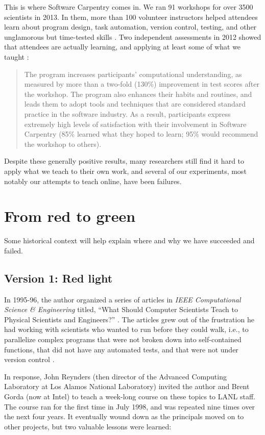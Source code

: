 \documentclass[10pt,a4paper,twocolumn]{article}
\begin{document}
This is where Software Carpentry comes in. We ran 91 workshops for
over 3500 scientists in 2013. In them, more than 100 volunteer
instructors helped attendees learn about program design, task
automation, version control, testing, and other unglamorous but
time-tested skills \cite{wilson2013}. Two independent assessments in
2012 showed that attendees are actually learning, and applying at least
some of what we taught \cite{aranda2012}:

\begin{quote}
The program increases participants' computational understanding, as
measured by more than a two-fold (130\%) improvement in test scores
after the workshop. The program also enhances their habits and routines,
and leads them to adopt tools and techniques that are considered
standard practice in the software industry. As a result, participants
express extremely high levels of satisfaction with their involvement in
Software Carpentry (85\% learned what they hoped to learn; 95\% would
recommend the workshop to others).
\end{quote}

Despite these generally positive results, many researchers still find it
hard to apply what we teach to their own work, and several of our
experiments, most notably our attempts to teach online, have been
failures.

\section*{From red to green}

Some historical context will help explain where and why we have
succeeded and failed.

\subsection*{Version 1: Red light}

In 1995-96, the author organized a series of articles in \emph{IEEE
Computational Science \& Engineering} titled, ``What Should Computer
Scientists Teach to Physical Scientists and Engineers?'' \cite{wilson1996}.
The articles grew out of the frustration he had working with scientists
who wanted to run before they could walk, i.e., to parallelize complex
programs that were not broken down into self-contained functions, that
did not have any automated tests, and that were not under version control
\cite{wilson2006a}.

In response, John Reynders (then director of the Advanced Computing
Laboratory at Los Alamos National Laboratory) invited the author and
Brent Gorda (now at Intel) to teach a week-long course on these topics
to LANL staff. The course ran for the first time in July 1998, and was
repeated nine times over the next four years. It eventually wound down
as the principals moved on to other projects, but two valuable lessons
were learned:
\end{document}
